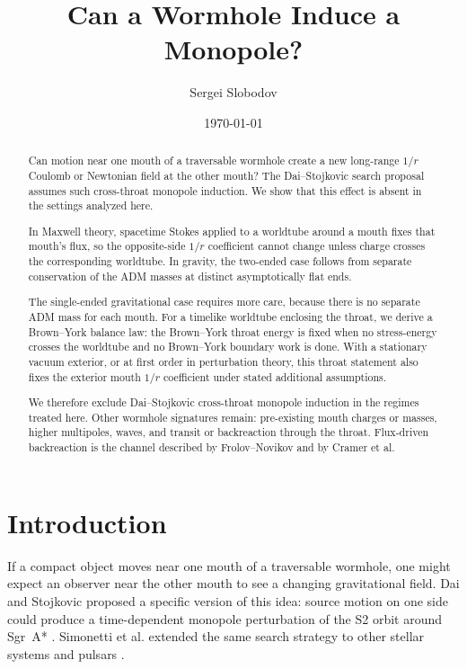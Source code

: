 \documentclass[aps,prd,10pt,onecolumn,nofootinbib,superscriptaddress,floatfix]{revtex4-2}
\begin{document}
\title{Can a Wormhole Induce a Monopole?}

\author{Sergei Slobodov}
\noaffiliation

\date{\today}

\begin{abstract}
Can motion near one mouth of a traversable wormhole create a new long-range
$1/r$ Coulomb or Newtonian field at the other mouth?  The Dai--Stojkovic search
proposal assumes such cross-throat monopole induction.  We show that this
effect is absent in the settings analyzed here.

In Maxwell theory, spacetime Stokes applied to a worldtube around a mouth fixes
that mouth's flux, so the opposite-side $1/r$ coefficient cannot change unless
charge crosses the corresponding worldtube.  In gravity, the two-ended case
follows from separate conservation of the ADM masses at distinct
asymptotically flat ends.

The single-ended gravitational case requires more care, because
there is no separate ADM mass for each mouth.  For a timelike worldtube
enclosing the throat, we derive a Brown--York balance law: the Brown--York
throat energy is fixed when no stress-energy crosses the worldtube and no
Brown--York boundary work is done.  With a stationary vacuum exterior, or at
first order in perturbation theory, this throat statement also fixes the
exterior mouth $1/r$ coefficient under stated additional assumptions.

We therefore exclude Dai--Stojkovic cross-throat monopole induction in the
regimes treated here.  Other wormhole signatures remain: pre-existing mouth
charges or masses, higher multipoles, waves, and transit or backreaction
through the throat.  Flux-driven backreaction is the channel described by
Frolov--Novikov and by Cramer et al.
\end{abstract}

\maketitle

\section{Introduction}
\label{sec:intro}

If a compact object moves near one mouth of a traversable wormhole, one might
expect an observer near the other mouth to see a changing gravitational field.
Dai and Stojkovic proposed a specific version of this idea: source motion on
one side could produce a time-dependent monopole perturbation of the S2 orbit
around Sgr~A*
\cite{DaiStojkovic2019Observing,DaiStojkovic2020ReplyObserving}.
Simonetti et al. extended the same search strategy to other stellar systems and
pulsars \cite{SimonettiEtAl2021SensitiveSearches}.
\end{document}
